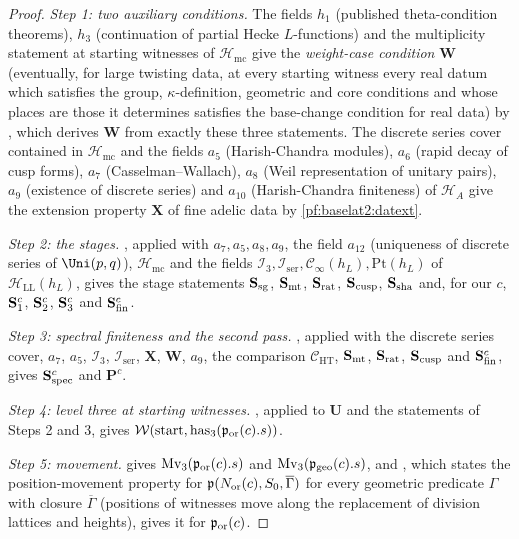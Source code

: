\begin{proof}
\emph{Step 1: two auxiliary conditions.} The fields $h_1$ (published theta-condition theorems), $h_3$
(continuation of partial Hecke $L$-functions) and the multiplicity statement at starting witnesses of
$\mathcal{H}_{\mathrm{mc}}$ give the \emph{weight-case condition} $\mathbf{W}$ (eventually, for large twisting
data, at every starting witness every real datum which satisfies the group, $\kappa$-definition, geometric and
core conditions and whose places are those it determines satisfies the base-change condition for real data)
by , which derives $\mathbf W$ from exactly these three
statements. The discrete series cover contained in $\mathcal H_{\mathrm{mc}}$
and the fields $a_5$ (Harish-Chandra modules), $a_6$ (rapid decay of cusp forms), $a_7$
(Casselman--Wallach), $a_8$ (Weil representation of unitary pairs), $a_9$ (existence of discrete series)
and $a_{10}$ (Harish-Chandra finiteness) of $\mathcal{H}_{A}$ give the extension property
$\mathbf{X}$ of fine adelic data by \cref{pf:baselat2:datext}.

\emph{Step 2: the stages.} , applied with $a_7,a_5,a_8,a_9$, the field $a_{12}$
(uniqueness of discrete series of $\Uni(p,q)$), $\mathcal{H}_{\mathrm{mc}}$ and the fields
$\mathcal I_3,\mathcal I_{\mathrm{ser}},\mathcal C_\infty(h_L),\mathrm{Pt}(h_L)$ of $\mathcal{H}_{\mathrm{LL}}(h_L)$, gives the
stage statements $\mathbf{S}_{\mathrm{sg}}$, $\mathbf{S}_{\mathrm{mt}}$, $\mathbf{S}_{\mathrm{rat}}$, $\mathbf{S}_{\mathrm{cusp}}$,
$\mathbf{S}_{\mathrm{sha}}$ and, for our $c$, $\mathbf{S}_{\mathrm{1}}^{c}$, $\mathbf{S}_{\mathrm{2}}^{c}$, $\mathbf{S}_{\mathrm{3}}^{c}$ and
$\mathbf{S}_{\mathrm{fin}}^{c}$.

\emph{Step 3: spectral finiteness and the second pass.} , applied with
the discrete series cover, $a_7$, $a_5$, $\mathcal I_3$, $\mathcal I_{\mathrm{ser}}$, $\mathbf{X}$, $\mathbf{W}$,
$a_9$, the comparison $\mathcal{C}_{\mathrm{HT}}$, $\mathbf{S}_{\mathrm{mt}}$, $\mathbf{S}_{\mathrm{rat}}$, $\mathbf{S}_{\mathrm{cusp}}$ and
$\mathbf{S}_{\mathrm{fin}}^{c}$, gives $\mathbf{S}_{\mathrm{spec}}^{c}$ and $\mathbf{P}^{c}$.

\emph{Step 4: level three at starting witnesses.} , applied to
$\mathbf{U}$ and the statements of Steps 2 and 3, gives
$\mathcal{W}(\mathrm{start},\mathrm{has}_3(\mathfrak{p}_{\mathrm{or}}(c).s))$.

\emph{Step 5: movement.}  gives $\mathrm{Mv}_3(\mathfrak{p}_{\mathrm{or}}(c).s)$
and $\mathrm{Mv}_3(\mathfrak{p}_{\mathrm{geo}}(c).s)$, and
, which states the position-movement
property for $\mathfrak{p}(N_{\mathrm{or}}(c),S_0,\overline\Gamma)$ for every geometric predicate $\Gamma$ with closure
$\overline\Gamma$ (positions of witnesses move along the replacement of division lattices and heights), gives it
for $\mathfrak{p}_{\mathrm{or}}(c)$.


\end{proof}
